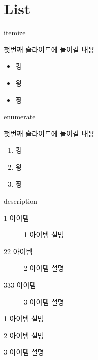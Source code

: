 \documentclass[10pt,blue,xcolor=pdftex,dvipsnames,table,handout]{beamer}
\begin{document}
		\section{List}
		\begin{frame}[t]{itemize}

			첫번째 슬라이드에 들어갈 내용
			\begin{itemize}
			\item 킹
			\item 왕
			\item 짱
			\end{itemize}

		\end{frame}






		\begin{frame}[t]{enumerate}

			첫번째 슬라이드에 들어갈 내용
			\begin{enumerate}
			\item 킹
			\item 왕
			\item 짱
			\end{enumerate}

		\end{frame}




		\begin{frame}[t]{description}

		\begin{description}
			\item[1 아이템] 1 아이템 설명
			\item[22 아이템] 2 아이템 설명
			\item[333 아이템] 3 아이템 설명

		\end{description}


		\begin{description}[123456789012345]
			\item[1 아이템] 1 아이템 설명
			\item[22 아이템] 2 아이템 설명
			\item[333 아이템] 3 아이템 설명
		\end{description}

		\end{frame}
\end{document}
